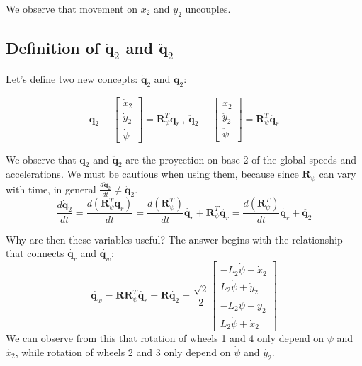 \documentclass[12pt]{article}
\renewcommand{\vec}[1]{\bm{#1}}
\newcommand{\R}{\mathbb R}
\def\R{\vec R}
\def\q{\vec q}
\begin{document}
We observe that movement on $x_2$ and $y_2$ uncouples.

\subsection*{Definition of $\dot{\q}_2$ and $\ddot{\q}_2$ }

Let's define two new concepts: $\dot{\q}_2$ and $\ddot{\q}_2$:

$$ \dot{\q}_2 \equiv \left[\begin{matrix}\dot{x}_{2}\\\dot{y}_{2}\\\dot{\psi}\end{matrix}\right] = \R_{\psi}^T \dot{\q_r}\ ,\ \ddot{\q}_2 \equiv \left[\begin{matrix}\ddot{x}_{2}\\\ddot{y}_{2}\\\ddot{\psi}\end{matrix}\right] = \R_{\psi}^T \ddot{\q_r}$$

We observe that $\dot{\q}_2$ and $\ddot{\q}_2$ are the proyection on base 2 of the global speeds and accelerations. We must be cautious when using them, because since $\R_{\psi}$ can vary with time, in general $\frac{d\dot{\q}_2}{dt}\neq\ddot{\q}_2$.
$$\frac{d\dot{\q}_2}{dt} = \frac{d(\R_{\psi}^T \dot{\q_r})}{dt} =  \frac{d(\R_{\psi}^T)}{dt}\dot{\q_r} + \R_{\psi}^T \ddot{\q_r}=  \frac{d(\R_{\psi}^T)}{dt}\dot{\q_r} + \ddot{\q_2}$$

Why are then these variables useful? The answer begins with the relationship that connects $\dot{\q_r}$ and $\dot{\q_w}$:
$$\dot{\q_w} = \R \R_{\psi}^T \dot{\q_r} = \R \dot{\q_2} = \frac{\sqrt{2}}{2}\left[\begin{matrix}- L_{2} \dot{\psi} + \dot{x}_{2}\\L_{2} \dot{\psi} + \dot{y}_{2}\\- L_{2} \dot{\psi} + \dot{y}_{2}\\L_{2} \dot{\psi} + \dot{x}_{2}\end{matrix}\right]$$
We can observe from this that rotation of wheels 1 and 4 only depend on $\dot{\psi}$ and $\dot{x_2}$, while rotation of wheels 2 and 3 only depend on $\dot{\psi}$ and $\dot{y_2}$.
\end{document}
